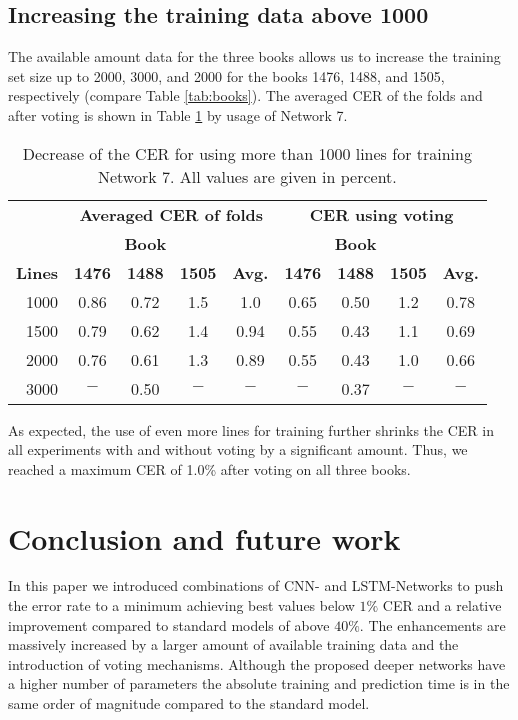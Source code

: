 \documentclass{jlcl}
\begin{document}
\subsection{Increasing the training data above 1000}
The available amount data for the three books allows us to increase the training set size up to 2000, 3000, and 2000 for the books 1476, 1488, and 1505, respectively (compare Table \ref{tab:books}).
The averaged CER of the folds and after voting is shown in Table \ref{tab:huge_lines} by usage of Network 7.
\begin{table}[t]
    \centering
    \caption{Decrease of the CER for using more than 1000 lines for training Network 7. All values are given in percent.}
    \label{tab:huge_lines}
    \begin{tabular}{r|ccc|c|ccc|c|}
        \hline
              & \multicolumn{4}{c|}{\textbf{Averaged CER of folds}} & \multicolumn{4}{c|}{\textbf{CER using voting}} \\
              & \multicolumn{3}{c|}{\textbf{Book}} & & \multicolumn{3}{c|}{\textbf{Book}} & \\
        \textbf{Lines} & \textbf{1476} & \textbf{1488} & \textbf{1505} & \textbf{Avg.} & \textbf{1476} & \textbf{1488} & \textbf{1505} & \textbf{Avg.} \\
        \hline
        1000 & 0.86 & 0.72 & 1.5 & 1.0  & 0.65 & 0.50 & 1.2 & 0.78 \\
        1500 & 0.79 & 0.62 & 1.4 & 0.94 & 0.55 & 0.43 & 1.1 & 0.69 \\
        2000 & 0.76 & 0.61 & 1.3 & 0.89 & 0.55 & 0.43 & 1.0 & 0.66 \\
        3000 &  $-$ & 0.50 & $-$ &  $-$ &  $-$ & 0.37 & $-$ &  $-$ \\
        \hline
    \end{tabular}
\end{table}
As expected, the use of even more lines for training further shrinks the CER in all experiments with and without voting by a significant amount.
Thus, we reached a maximum CER of 1.0\% after voting on all three books.

\section{Conclusion and future work}
In this paper we introduced combinations of CNN- and LSTM-Networks to push the error rate to a minimum achieving best values below $1\%$ CER and a relative improvement compared to standard models of above $40\%$.
The enhancements are massively increased by a larger amount of available training data and the introduction of voting mechanisms.
Although the proposed deeper networks have a higher number of parameters the absolute training and prediction time is in the same order of magnitude compared to the standard model.
\end{document}
